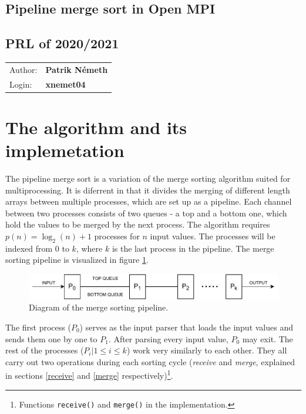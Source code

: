 \documentclass[pdftex, 11pt, a4paper, titlepage]{article}
\begin{document}
    \begin{center}
        \section*{Pipeline merge sort in Open MPI}
        \subsection*{PRL of 2020/2021}
        \begin{tabular}{ l l }
            Author: & \textbf{Patrik Németh} \\
            Login: & \textbf{xnemet04}
        \end{tabular}
    \end{center}
    \section{The algorithm and its implemetation}
        The pipeline merge sort is a variation of the merge sorting algorithm suited for multiprocessing.
        It is diferrent in that it divides the merging of different length arrays between multiple processes,
        which are set up as a pipeline. Each channel between two processes consists of two queues - a top and a bottom
        one, which hold the values to be merged by the next process. The algorithm requires $p(n) = \log_{2}(n)+1$ processes
        for $n$ input values. The processes will be indexed from $0$ to $k$, where $k$ is the last process in the pipeline.
        The merge sorting pipeline is visualized in figure \ref{pms_diagram}.

        \begin{figure}[h]
            \centering
            \includegraphics[scale=0.8]{pms_diagram.pdf}
            \caption{Diagram of the merge sorting pipeline.}
            \label{pms_diagram}
        \end{figure}

        The first process ($P_0$) serves as the input parser that loads the input values and sends them one by
        one to $P_1$. After parsing every input value, $P_0$ may exit. The rest of the processes
        ($P_i | 1\leq{}i\leq{}k$) work very similarly to each other. They all carry out two operations during each sorting cycle
        (\emph{receive} and \emph{merge}, explained in sections \ref{receive} and \ref{merge} respectively)\footnote{Functions
        \texttt{receive()} and \texttt{merge()} in the implementation.}.
\end{document}
